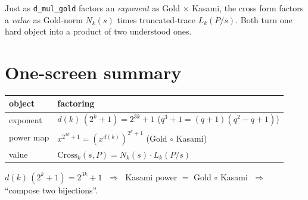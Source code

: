 \documentclass[11pt]{article}
\begin{document}
\noindent
Just as \texttt{d\_mul\_gold} factors an \emph{exponent} as Gold $\times$ Kasami,
the cross form factors a \emph{value} as Gold-norm $N_k(s)$ times truncated-trace
$L_k(P/s)$. Both turn one hard object into a product of two understood ones.


\bigskip

\section*{One-screen summary}

\begin{center}
\renewcommand{\arraystretch}{1.6}
\begin{tabular}{l l}
\textbf{object} & \textbf{factoring} \\
\hline
exponent & $d(k)\,(2^k+1)=2^{3k}+1$ \;($q^3+1=(q+1)(q^2-q+1)$) \\
power map & $x^{2^{3k}+1}=(x^{d(k)})^{2^k+1}$ \;(Gold $\circ$ Kasami) \\
value & $\mathrm{Cross}_k(s,P)=N_k(s)\cdot L_k(P/s)$ \\
\end{tabular}
\end{center}

\bigskip
\noindent
\colorbox{leanbg}{\parbox{\dimexpr\linewidth-2\fboxsep}{\centering
$d(k)\,(2^k+1)=2^{3k}+1$ $\;\Rightarrow\;$ Kasami power $=$ Gold $\circ$ Kasami
$\;\Rightarrow\;$ ``compose two bijections''.}}
\end{document}
